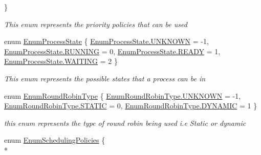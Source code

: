 \begin{DoxyCompactItemize}
 \}\begin{DoxyCompactList}\small\item\em This enum represents the priority policies that can be used \end{DoxyCompactList}
\item 
enum \hyperlink{namespace_c_p_u___o_s___simulator_1_1_operating___system_a836ee2204e78fcb3a7dd6c3c942b1a24}{Enum\+Process\+State} \{ \hyperlink{namespace_c_p_u___o_s___simulator_1_1_operating___system_a836ee2204e78fcb3a7dd6c3c942b1a24a696b031073e74bf2cb98e5ef201d4aa3}{Enum\+Process\+State.\+U\+N\+K\+N\+O\+W\+N} = -\/1, 
\hyperlink{namespace_c_p_u___o_s___simulator_1_1_operating___system_a836ee2204e78fcb3a7dd6c3c942b1a24a43491564ebcfd38568918efbd6e840fd}{Enum\+Process\+State.\+R\+U\+N\+N\+I\+N\+G} = 0, 
\hyperlink{namespace_c_p_u___o_s___simulator_1_1_operating___system_a836ee2204e78fcb3a7dd6c3c942b1a24a2baa69eafc7204f3bd8648eba580c489}{Enum\+Process\+State.\+R\+E\+A\+D\+Y} = 1, 
\hyperlink{namespace_c_p_u___o_s___simulator_1_1_operating___system_a836ee2204e78fcb3a7dd6c3c942b1a24a1869d56535e8b1449a6da54ff5e11f50}{Enum\+Process\+State.\+W\+A\+I\+T\+I\+N\+G} = 2
 \}\begin{DoxyCompactList}\small\item\em This enum represents the possible states that a process can be in \end{DoxyCompactList}
\item 
enum \hyperlink{namespace_c_p_u___o_s___simulator_1_1_operating___system_a4c7effb8b6725df52018a3a14cede96e}{Enum\+Round\+Robin\+Type} \{ \hyperlink{namespace_c_p_u___o_s___simulator_1_1_operating___system_a4c7effb8b6725df52018a3a14cede96ea696b031073e74bf2cb98e5ef201d4aa3}{Enum\+Round\+Robin\+Type.\+U\+N\+K\+N\+O\+W\+N} = -\/1, 
\hyperlink{namespace_c_p_u___o_s___simulator_1_1_operating___system_a4c7effb8b6725df52018a3a14cede96eafe6f99ef1ec99efbdc19a9786cf1facc}{Enum\+Round\+Robin\+Type.\+S\+T\+A\+T\+I\+C} = 0, 
\hyperlink{namespace_c_p_u___o_s___simulator_1_1_operating___system_a4c7effb8b6725df52018a3a14cede96ea0fcc90da4811c877ba9f9c12f7d60bc9}{Enum\+Round\+Robin\+Type.\+D\+Y\+N\+A\+M\+I\+C} = 1
 \}\begin{DoxyCompactList}\small\item\em this enum represents the type of round robin being used i.\+e Static or dynamic \end{DoxyCompactList}
\item 
enum \hyperlink{namespace_c_p_u___o_s___simulator_1_1_operating___system_ad0cdaacf9652394d23fa29109640fe08}{Enum\+Scheduling\+Policies} \{ \\*

\end{DoxyCompactItemize}
